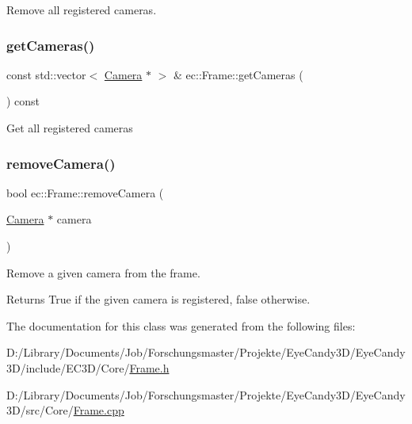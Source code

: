 Remove all registered cameras. \mbox{\label{classec_1_1_frame_a80aefbcba8339fabc3b4aa2b8b21a8bf}} 
\subsubsection{\texorpdfstring{get\+Cameras()}{getCameras()}}
{\footnotesize\ttfamily const std\+::vector$<$ \mbox{\hyperlink{classec_1_1_camera}{Camera}} $\ast$ $>$ \& ec\+::\+Frame\+::get\+Cameras (\begin{DoxyParamCaption}{ }\end{DoxyParamCaption}) const}

Get all registered cameras \mbox{\label{classec_1_1_frame_a7a93ec89a809f5b7e685c5adc73d6cda}} 
\subsubsection{\texorpdfstring{remove\+Camera()}{removeCamera()}}
{\footnotesize\ttfamily bool ec\+::\+Frame\+::remove\+Camera (\begin{DoxyParamCaption}\item[{\mbox{\hyperlink{classec_1_1_camera}{Camera}} $\ast$}]{camera }\end{DoxyParamCaption})}

Remove a given camera from the frame. \begin{DoxyReturn}{Returns}
True if the given camera is registered, false otherwise. 
\end{DoxyReturn}


The documentation for this class was generated from the following files\+:\begin{DoxyCompactItemize}
\item 
D\+:/\+Library/\+Documents/\+Job/\+Forschungsmaster/\+Projekte/\+Eye\+Candy3\+D/\+Eye\+Candy3\+D/include/\+E\+C3\+D/\+Core/\mbox{\hyperlink{_frame_8h}{Frame.\+h}}\item 
D\+:/\+Library/\+Documents/\+Job/\+Forschungsmaster/\+Projekte/\+Eye\+Candy3\+D/\+Eye\+Candy3\+D/src/\+Core/\mbox{\hyperlink{_frame_8cpp}{Frame.\+cpp}}\end{DoxyCompactItemize}
